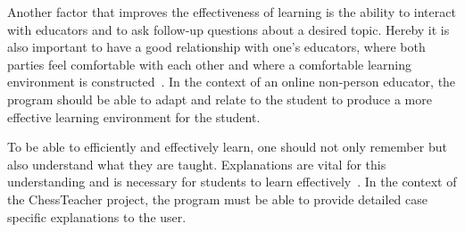 Another factor that improves the effectiveness of learning is the ability to interact with educators and to ask
follow-up questions about a desired topic.
Hereby it is also important to have a good relationship with one's educators, where both parties feel comfortable with
each other and where a comfortable learning environment is constructed~\cite{saha2009}.
In the context of an online non-person educator, the program should be able to adapt and relate to the student to
produce a more effective learning environment for the student.

To be able to efficiently and effectively learn, one should not only remember but also understand what they are taught.
Explanations are vital for this understanding and is necessary for students to learn effectively~\cite{williams2010}.
In the context of the ChessTeacher project, the program must be able to provide detailed case specific explanations to
the user.
